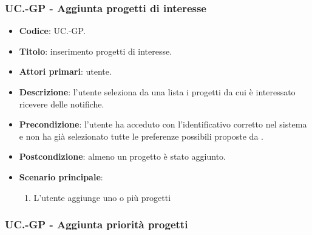     \subsubsection{UC\theuccount.\thesubuccount-GP - Aggiunta progetti di interesse}
    
    \begin{itemize}
        \item \textbf{Codice}: UC\theuccount.\thesubuccount-GP.
        \item \textbf{Titolo}: inserimento progetti di interesse.
        \item \textbf{Attori primari}: utente.
        \item \textbf{Descrizione}: l'utente seleziona da una lista i progetti da cui è interessato ricevere delle notifiche.
        \item \textbf{Precondizione}: l'utente ha acceduto con l'identificativo corretto nel sistema e non ha già selezionato tutte le preferenze possibili proposte da \progetto.
        \item \textbf{Postcondizione}: almeno un progetto è stato aggiunto.
        \item \textbf{Scenario principale}:
        \begin{enumerate}
            \item L'utente aggiunge uno o più progetti
        \end{enumerate}
    \end{itemize}
    
    \subsubsection{UC\theuccount.\thesubuccount-GP - Aggiunta priorità progetti}
    
